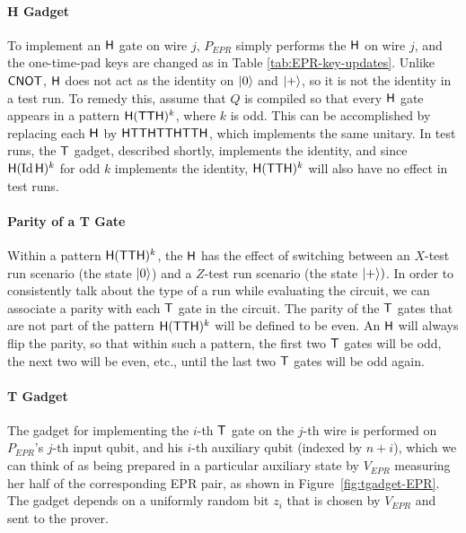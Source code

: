 \paragraph{H Gadget} To implement an $\sf H$ gate on wire $j$, $P_{EPR}$ simply performs the $\sf H$ on wire $j$, and the one-time-pad keys are changed as in Table \ref{tab:EPR-key-updates}. Unlike $\sf CNOT$, $\sf H$ does not act as the identity on $|0\rangle$ and $|+\rangle$, so it is not the identity in a test run. To remedy this, assume that $Q$ is compiled so that every $\sf H$ gate appears in a pattern ${\sf H}({\sf TTH})^k$, where $k$ is odd. This can be accomplished by replacing each $\sf H$ by $\sf HTTHTTHTTH$, which implements the same unitary. In test runs, the $\sf T$ gadget, described shortly, implements the identity, and since ${\sf H}(\mathop{\rm Id}\nolimits {\sf H})^k$ for odd $k$ implements the identity, ${\sf H}({\sf TTH})^k$ will also have no effect in test runs. 

\paragraph{Parity of a T Gate} Within a pattern ${\sf H}({\sf TTH})^k$, the $\sf H$ has the effect of switching between an $X$-test run scenario (the state $|0\rangle$) and a $Z$-test run scenario (the state $|+\rangle)$. In order to consistently talk about the type of a run while evaluating the circuit, we can associate a parity with each $\sf T$ gate in the circuit. The parity of the $\sf T$ gates that are not part of the pattern ${\sf H}({\sf TTH})^k$ will be defined to be even. An ${\sf H}$ will always flip the parity, so that within such a pattern, the first two ${\sf T}$ gates will be odd, the next two will be even, etc., until the last two $\sf T$ gates will be odd again. 

\paragraph{T Gadget} The gadget for implementing the $i$-th $\sf T$ gate on the $j$-th wire is performed on $P_{EPR}$'s $j$-th input qubit, and his $i$-th auxiliary qubit (indexed by $n+i$), which we can think of as being prepared in a particular auxiliary state by $V_{EPR}$ measuring her half of the corresponding EPR pair, as shown in Figure~\ref{fig:tgadget-EPR}. The gadget depends on a uniformly random bit $z_i$ that is chosen by $V_{EPR}$ and sent to the prover. 




